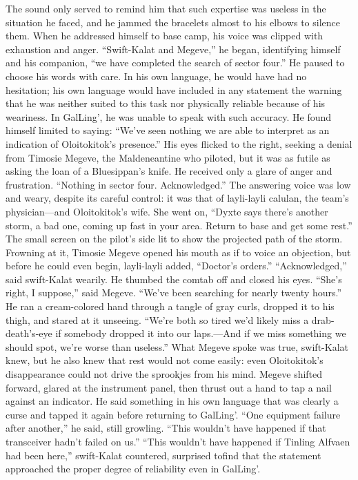\documentclass[9pt]{article}
\begin{document}
The sound only served to remind him that such expertise was useless in the situation he faced, and he
jammed the bracelets almost to his elbows to silence them. When he addressed himself to base camp, his
voice was clipped with exhaustion and anger.
“Swift-Kalat and Megeve,” he began, identifying himself and his companion, “we have completed the
search of sector four.” He paused to choose his words with care. In his own language, he would have
had no hesitation; his own language would have included in any statement the warning that he was neither
suited to this task nor physically reliable because of his weariness. In GalLing’, he was unable to speak
with such accuracy. He found himself limited to saying: “We’ve seen nothing we are able to interpret as
an indication of Oloitokitok’s presence.” His eyes flicked to the right, seeking a denial from Timosie
Megeve, the Maldeneantine who piloted, but it was as futile as asking the loan of a Bluesippan’s knife.
He received only a glare of anger and frustration.
“Nothing in sector four. Acknowledged.” The answering voice was low and weary, despite its careful
control: it was that of layli-layli calulan, the team’s physician—and Oloitokitok’s wife. She went on,
“Dyxte says there’s another storm, a bad one, coming up fast in your area. Return to base and get some
rest.”
The small screen on the pilot’s side lit to show the projected path of the storm. Frowning at it,
Timosie Megeve opened his mouth as if to voice an objection, but before he could even begin, layli-layli
added, “Doctor’s orders.”
“Acknowledged,” said swift-Kalat wearily. He thumbed the comtab off and closed his eyes.
“She’s right, I suppose,” said Megeve. “We’ve been searching for nearly twenty hours.” He ran a
cream-colored hand through a tangle of gray curls, dropped it to his thigh, and stared at it unseeing.
“We’re both so tired we’d likely miss a drab-death’s-eye if somebody dropped it into our laps.—And if
we miss something we should spot, we’re worse than useless.”
What Megeve spoke was true, swift-Kalat knew, but he also knew that rest would not come easily:
even Oloitokitok’s disappearance could not drive the sprookjes from his mind.
Megeve shifted forward, glared at the instrument panel, then thrust out a hand to tap a nail against an
indicator. He said something in his own language that was clearly a curse and tapped it again before
returning to GalLing’. “One equipment failure after another,” he said, still growling. “This wouldn’t have
happened if that transceiver hadn’t failed on us.”
“This wouldn’t have happened if Tinling Alfvaen had been here,” swift-Kalat countered, surprised tofind that the statement approached the proper degree of reliability even in GalLing’.
\end{document}
